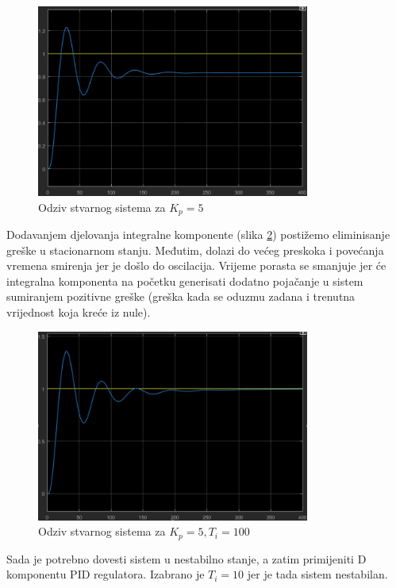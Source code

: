 \begin{figure} [H]
  \centering
  \includegraphics[width=0.8\textwidth]{z2_11}
  \caption{Odziv stvarnog sistema za $K_p=5$}
  \label{fig:z2_11}
\end{figure}

Dodavanjem djelovanja integralne komponente (slika \ref{fig:z2_12}) postižemo eliminisanje greške u stacionarnom stanju. Međutim, dolazi do većeg preskoka i povećanja vremena smirenja jer je došlo do oscilacija. Vrijeme porasta se smanjuje jer će integralna komponenta na početku generisati dodatno pojačanje u sistem sumiranjem pozitivne greške (greška kada se oduzmu zadana i trenutna vrijednost koja kreće iz nule).

\begin{figure} [H]
  \centering
  \includegraphics[width=0.8\textwidth]{z2_12}
  \caption{Odziv stvarnog sistema za $K_p=5, T_i=100$}
  \label{fig:z2_12}
\end{figure}

Sada je potrebno dovesti sistem u nestabilno stanje, a zatim primijeniti D komponentu PID regulatora. Izabrano je $T_i=10$ jer je tada sistem nestabilan.

